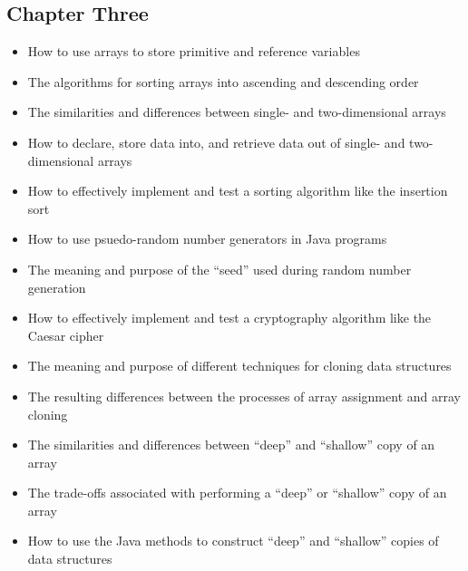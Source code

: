 \documentclass[11pt]{article}
\begin{document}
\vspace*{-.2in}
\subsection*{Chapter Three}

\begin{itemize}

  \item How to use arrays to store primitive and reference variables

  \item The algorithms for sorting arrays into ascending and descending order

  \item The similarities and differences between single- and two-dimensional
    arrays

  \item How to declare, store data into, and retrieve data out of single- and
    two-dimensional arrays

  \item How to effectively implement and test a sorting algorithm like the
    insertion sort

  \item How to use psuedo-random number generators in Java programs

  \item The meaning and purpose of the ``seed'' used during random number
    generation


  \item How to effectively implement and test a cryptography algorithm like the
    Caesar cipher

  \item The meaning and purpose of different techniques for cloning data structures

  \item The resulting differences between the processes of array assignment and
    array cloning

  \item The similarities and differences between ``deep'' and ``shallow'' copy
    of an array

  \item The trade-offs associated with performing a ``deep'' or ``shallow'' copy
    of an array

  \item How to use the Java methods to construct ``deep'' and ``shallow'' copies
    of data structures

\end{itemize}
\end{document}
